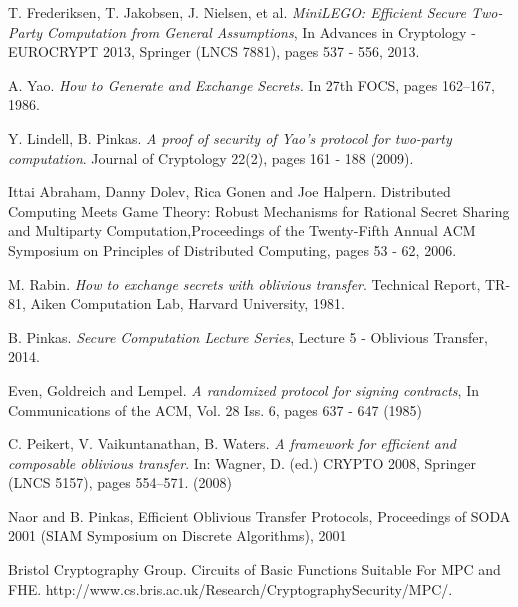 \documentclass[a4paper,11pt]{article}
\begin{document}
\begin{thebibliography}{5}
			T. Frederiksen, T. Jakobsen, J. Nielsen, et al. \emph{MiniLEGO: Efficient Secure Two-Party Computation from General Assumptions}, In Advances in Cryptology - EUROCRYPT 2013, Springer (LNCS 7881), pages 537 - 556, 2013.

			A. Yao. \emph{How to Generate and Exchange Secrets.} In 27th FOCS, pages 162–167, 1986.

			Y. Lindell, B. Pinkas. \emph{A proof of security of Yao’s protocol for two-party computation}. Journal of Cryptology 22(2), pages 161 - 188 (2009).

			Ittai Abraham, Danny Dolev, Rica Gonen and Joe Halpern. Distributed Computing Meets Game Theory: Robust Mechanisms for Rational Secret Sharing and Multiparty Computation,Proceedings of the Twenty-Fifth Annual ACM Symposium on Principles of Distributed Computing,  pages 53 - 62, 2006.

			M. Rabin. \emph{How to exchange secrets with oblivious transfer}. Technical Report, TR-81, Aiken Computation Lab, Harvard University, 1981.

			B. Pinkas. \emph{Secure Computation Lecture Series}, Lecture 5 - Oblivious Transfer, 2014.

			Even, Goldreich and Lempel. \emph{A randomized protocol for signing contracts}, In Communications of the ACM, Vol. 28 Iss. 6, pages 637 - 647 (1985)

			C. Peikert, V. Vaikuntanathan, B. Waters. \emph{A framework for efficient and composable oblivious transfer}. In: Wagner, D. (ed.) CRYPTO 2008, Springer (LNCS 5157), pages 554–571. (2008)

			Naor and B. Pinkas, Efficient Oblivious Transfer Protocols, Proceedings of SODA 2001 (SIAM Symposium on Discrete Algorithms), 2001

			Bristol Cryptography Group. Circuits of Basic Functions Suitable For MPC and FHE. http://www.cs.bris.ac.uk/Research/CryptographySecurity/MPC/. 

	\end{thebibliography}
\end{document}
